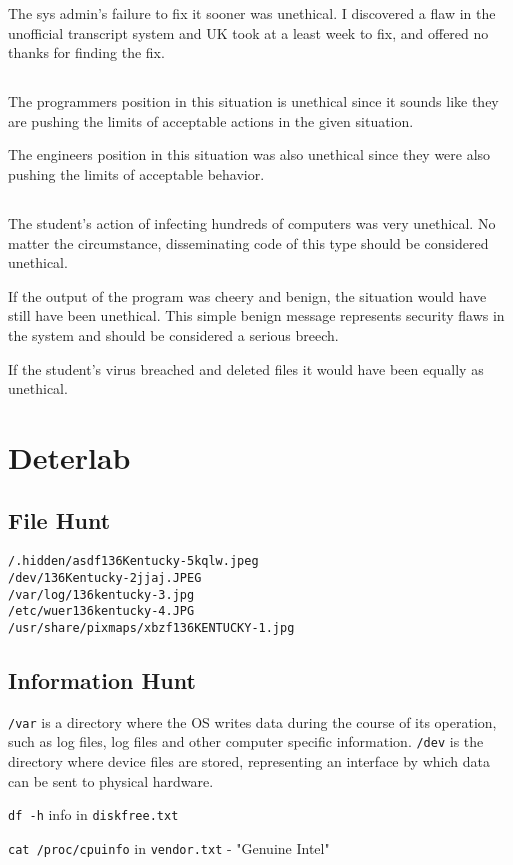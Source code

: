 \documentclass[letterpaper]{article}
\begin{document}
The sys admin's failure to fix it sooner was unethical. I discovered a flaw in the unofficial transcript system and UK took at a least week to fix, and offered no thanks for finding the fix.

\subsection{}
The programmers position in this situation is unethical since it sounds like they are pushing the limits of acceptable actions in the given situation. 

The engineers position in this situation was also unethical since they were also pushing the limits of acceptable behavior. 

\subsection{}
The student's action of infecting hundreds of computers was very unethical. No matter the circumstance, disseminating code of this type should be considered unethical.

If the output of the program was cheery and benign, the situation would have still have been unethical. This simple benign message represents security flaws in the system and should be considered a serious breech.

If the student's virus breached and deleted files it would have been equally as unethical.

\section{Deterlab}
\subsection{File Hunt}
\begin{verbatim}
/.hidden/asdf136Kentucky-5kqlw.jpeg
/dev/136Kentucky-2jjaj.JPEG
/var/log/136kentucky-3.jpg
/etc/wuer136kentucky-4.JPG
/usr/share/pixmaps/xbzf136KENTUCKY-1.jpg
\end{verbatim}

\subsection{Information Hunt} \texttt{/var} is a directory where the OS writes data during the course of its operation, such as log files, log files and other computer specific information.
\texttt{/dev} is the directory where device files are stored, representing an interface by which data can be sent to physical hardware.

\texttt{df -h} info in \texttt{diskfree.txt}

\texttt{cat /proc/cpuinfo} in \texttt{vendor.txt} - "Genuine Intel"
\end{document}
